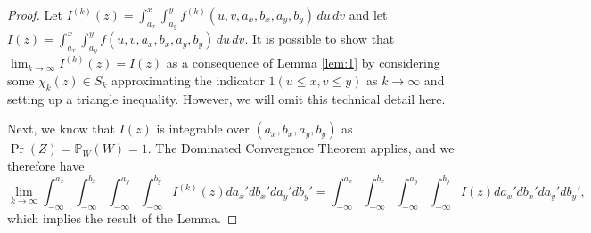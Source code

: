 \begin{proof}
  Let
  $I^{(k)}(z) = \displaystyle \int_{a_x}^{x} \displaystyle
  \int_{a_y}^{y} f^{(k)}(u,v,a_x,b_x,a_y,b_y)\, du\,dv$ and let
  $I(z) = \displaystyle \int_{a_x}^{x} \displaystyle \int_{a_y}^{y}
  f(u,v,a_x,b_x,a_y,b_y)\, du\,dv$. It is possible to show that
  $\lim_{k\to \infty} I^{(k)}(z) = I(z)$ as a consequence of Lemma
  \ref{lem:1} by considering some $\chi_k(z) \in S_k$ approximating
  the indicator $1(u \leq x, v \leq y)$ as $k \to \infty$ and setting up a triangle
  inequality. However, we will omit this technical detail here.

  Next, we know that $I(z)$ is integrable over $(a_x, b_x, a_y, b_y)$
  as $\Pr(Z) = \mathbb{P}_{W}(W) = 1$. The Dominated Convergence
  Theorem applies, and we therefore have
  \[
    \lim_{k \to \infty} \displaystyle \int_{-\infty}^{a_x} \displaystyle \int_{-\infty}^{b_x} \displaystyle \int_{-\infty}^{a_y} \displaystyle \int_{-\infty}^{b_y} I^{(k)}(z) da_x' db_x' da_y' db_y' = \displaystyle \int_{-\infty}^{a_x} \displaystyle \int_{-\infty}^{b_x} \displaystyle \int_{-\infty}^{a_y} \displaystyle \int_{-\infty}^{b_y} I(z) da_x' db_x' da_y' db_y',
  \]
  which implies the result of the Lemma.
\end{proof}

